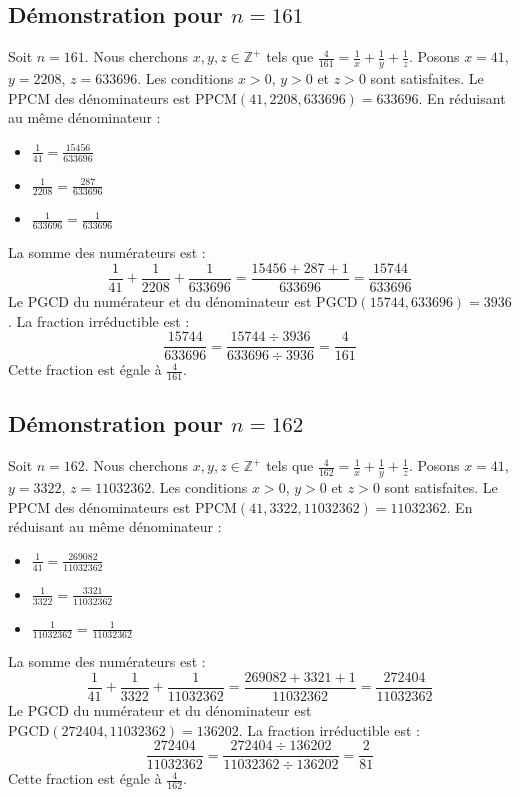 \documentclass[11pt,a4paper]{article}
\begin{document}
\subsection{Démonstration pour $n = 161$}
Soit $n = 161$. Nous cherchons $x, y, z \in \mathbb{Z}^{+}$ tels que $\frac{4}{161} = \frac{1}{x} + \frac{1}{y} + \frac{1}{z}$.
Posons $x = 41$, $y = 2208$, $z = 633696$.
Les conditions $x > 0$, $y > 0$ et $z > 0$ sont satisfaites.
Le PPCM des dénominateurs est $\text{PPCM}(41, 2208, 633696) = 633696$.
En réduisant au même dénominateur :
\begin{itemize}
    \item $\frac{1}{41} = \frac{15456}{633696}$
    \item $\frac{1}{2208} = \frac{287}{633696}$
    \item $\frac{1}{633696} = \frac{1}{633696}$
\end{itemize}
La somme des numérateurs est :
$$ \frac{1}{41} + \frac{1}{2208} + \frac{1}{633696} = \frac{15456 + 287 + 1}{633696} = \frac{15744}{633696} $$
Le PGCD du numérateur et du dénominateur est $\text{PGCD}(15744, 633696) = 3936$.
La fraction irréductible est :
$$ \frac{15744}{633696} = \frac{15744 \div 3936}{633696 \div 3936} = \frac{4}{161} $$
Cette fraction est égale à $\frac{4}{161}$.

\subsection{Démonstration pour $n = 162$}
Soit $n = 162$. Nous cherchons $x, y, z \in \mathbb{Z}^{+}$ tels que $\frac{4}{162} = \frac{1}{x} + \frac{1}{y} + \frac{1}{z}$.
Posons $x = 41$, $y = 3322$, $z = 11032362$.
Les conditions $x > 0$, $y > 0$ et $z > 0$ sont satisfaites.
Le PPCM des dénominateurs est $\text{PPCM}(41, 3322, 11032362) = 11032362$.
En réduisant au même dénominateur :
\begin{itemize}
    \item $\frac{1}{41} = \frac{269082}{11032362}$
    \item $\frac{1}{3322} = \frac{3321}{11032362}$
    \item $\frac{1}{11032362} = \frac{1}{11032362}$
\end{itemize}
La somme des numérateurs est :
$$ \frac{1}{41} + \frac{1}{3322} + \frac{1}{11032362} = \frac{269082 + 3321 + 1}{11032362} = \frac{272404}{11032362} $$
Le PGCD du numérateur et du dénominateur est $\text{PGCD}(272404, 11032362) = 136202$.
La fraction irréductible est :
$$ \frac{272404}{11032362} = \frac{272404 \div 136202}{11032362 \div 136202} = \frac{2}{81} $$
Cette fraction est égale à $\frac{4}{162}$.
\end{document}

